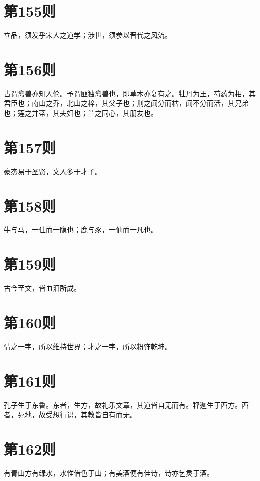 \documentclass[12pt,a4paper]{ctexbook}
\begin{document}
\section{第155则}
立品，须发乎宋人之道学；涉世，须参以晋代之风流。\par

\section{第156则}
古谓禽兽亦知人伦。予谓匪独禽兽也，即草木亦复有之。牡丹为王，芍药为相，其君臣也；南山之乔，北山之梓，其父子也；荆之闻分而枯，闻不分而活，其兄弟也；莲之并蒂，其夫妇也；兰之同心，其朋友也。\par

\section{第157则}
豪杰易于圣贤，文人多于才子。\par

\section{第158则}
牛与马，一仕而一隐也；鹿与豕，一仙而一凡也。\par

\section{第159则}
古今至文，皆血泪所成。\par

\section{第160则}
情之一字，所以维持世界；才之一字，所以粉饰乾坤。\par

\section{第161则}
孔子生于东鲁。东者，生方，故礼乐文章，其道皆自无而有。释迦生于西方。西者，死地，故受想行识，其教皆自有而无。\par

\section{第162则}
有青山方有绿水，水惟借色于山；有美酒便有佳诗，诗亦乞灵于酒。\par
\end{document}
